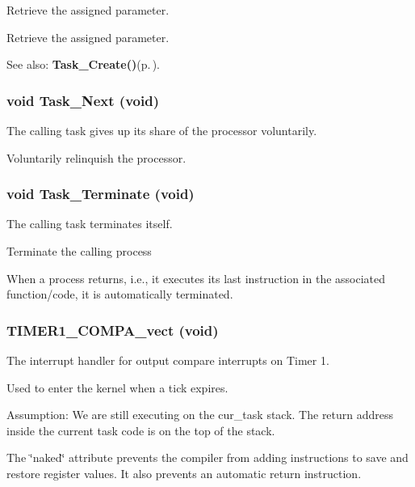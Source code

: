 Retrieve the assigned parameter. 

Retrieve the assigned parameter. \begin{Desc}
\item[See also:]{\bf Task\_\-Create()}{\rm (p.\,\pageref{os_8c_d26f7e7c3185a703e89e97547747b03e})}. \end{Desc}
\subsubsection{\setlength{\rightskip}{0pt plus 5cm}void Task\_\-Next (void)}\label{os_8c_5a9b72d0dadaea32fec8d4ff1c0eafa4}


The calling task gives up its share of the processor voluntarily. 

Voluntarily relinquish the processor. 
\subsubsection{\setlength{\rightskip}{0pt plus 5cm}void Task\_\-Terminate (void)}\label{os_8c_266ddbe2a3ded7e68eaa0d68a4047387}


The calling task terminates itself. 

Terminate the calling process

When a process returns, i.e., it executes its last instruction in the associated function/code, it is automatically terminated. 
\subsubsection{\setlength{\rightskip}{0pt plus 5cm}TIMER1\_\-COMPA\_\-vect (void)}\label{os_8c_a5bea28826fceb06503c295132d2ac03}


The interrupt handler for output compare interrupts on Timer 1. 

Used to enter the kernel when a tick expires.

Assumption: We are still executing on the cur\_\-task stack. The return address inside the current task code is on the top of the stack.

The \char`\"{}naked\char`\"{} attribute prevents the compiler from adding instructions to save and restore register values. It also prevents an automatic return instruction. 

